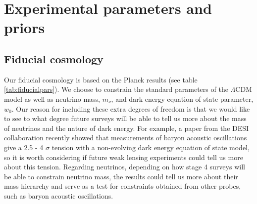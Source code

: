 \documentclass[11pt]{article} %
\begin{document}
\section{Experimental parameters and priors}\label{sec:calcdetails}
\subsection{Fiducial cosmology}
Our fiducial cosmology is based on the Planck results \cite{planckresults} (see table \ref{tab:fiducialpars}). We choose to constrain the standard parameters of the $\Lambda$CDM model as well as neutrino mass, $m_\nu$, and dark energy equation of state parameter, $w_0$. Our reason for including these extra degrees of freedom is that we would like to see to what degree future surveys will be able to tell us more about the mass of neutrinos and the nature of dark energy. For example, a paper from the DESI collaboration \cite{Roy2024DESI} recently showed that measurements of baryon acoustic oscillations give a 2.5 - 4 $\sigma$ tension with a non-evolving dark energy equation of state model, so it is worth considering if future weak lensing experiments could tell us more about this tension. Regarding neutrinos, depending on how stage 4 surveys will be able to constrain neutrino mass, the results could tell us more about their mass hierarchy and serve as a test for constraints obtained from other probes, such as baryon acoustic oscillations.
\end{document}
